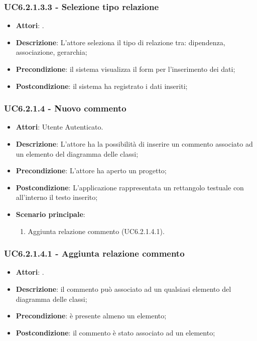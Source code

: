 \subsubsection{UC6.2.1.3.3 - Selezione tipo relazione} 
\label{sssec:UC6.2.1.3.3} 
\begin{itemize} 
\item \textbf{Attori}: .
\item \textbf{Descrizione}: L'attore seleziona il tipo di relazione tra: dipendenza, associazione, gerarchia;
\item \textbf{Precondizione}: il sistema visualizza il form per l'inserimento dei dati;
\item \textbf{Postcondizione}: il sistema ha registrato i dati inseriti;
\end{itemize} 
\subsubsection{UC6.2.1.4 - Nuovo commento} 
\label{sssec:UC6.2.1.4} 
\begin{itemize} 
\item \textbf{Attori}: Utente Autenticato.
\item \textbf{Descrizione}: L'attore ha la possibilità di inserire un commento associato ad un elemento del diagramma delle classi;
\item \textbf{Precondizione}: L'attore ha aperto un progetto;
\item \textbf{Postcondizione}: L'applicazione rappresentata un rettangolo testuale con all'interno il testo inserito;
\item \textbf{Scenario principale}: \begin{enumerate}\item Aggiunta relazione commento (UC6.2.1.4.1). 
 \end{enumerate}
\end{itemize} 
\subsubsection{UC6.2.1.4.1 - Aggiunta relazione commento} 
\label{sssec:UC6.2.1.4.1} 
\begin{itemize} 
\item \textbf{Attori}: .
\item \textbf{Descrizione}: il commento può associato ad un qualsiasi elemento del diagramma delle classi;
\item \textbf{Precondizione}: è presente almeno un elemento;
\item \textbf{Postcondizione}: il commento è stato associato ad un elemento;
\end{itemize} 
